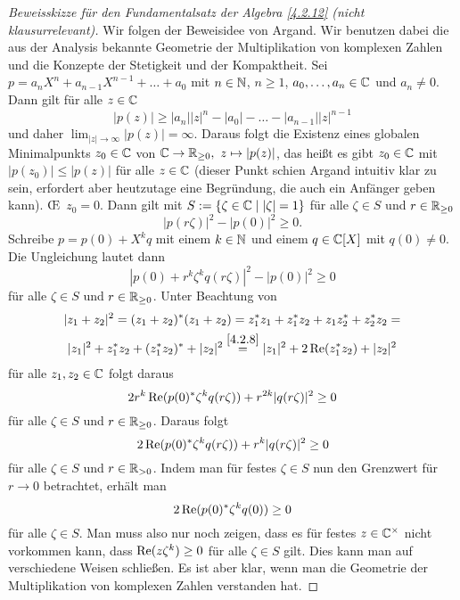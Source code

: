 \documentclass[../../main.tex]{subfiles}
\begin{document}
\begin{proof}[Beweisskizze für den Fundamentalsatz der Algebra \ref{4.2.12} (nicht klausurrelevant)] Wir folgen der Beweisidee
von Argand. Wir benutzen dabei die aus der Analysis bekannte
Geometrie der Multiplikation von komplexen Zahlen und die Konzepte der Stetigkeit und der Kompaktheit.
Sei $p=a_nX^n+a_{n-1}X^{n-1}+\dots+a_0$ mit $n\in\mathbb N$, $n\ge1$, $a_0,\dots,a_n\in\mathbb C$ und $a_n\ne0$. Dann gilt für alle $z\in\mathbb C$
$$|p(z)|\ge|a_n||z|^n-|a_0|-\dots-|a_{n-1}||z|^{n-1}$$
und daher $\lim_{|z|\to\infty}|p(z)|=\infty$. Daraus folgt die Existenz eines globalen Minimalpunkts $z_0\in\mathbb C$ von $\mathbb C\to\mathbb R_{\ge0},\ z\mapsto|p(z)|$, das heißt es gibt $z_0\in\mathbb C$
mit $|p(z_0)|\le|p(z)|$ für alle $z\in\mathbb C$ (dieser Punkt schien Argand intuitiv klar zu sein, erfordert aber heutzutage eine Begründung, die auch ein Anfänger geben kann). \OE\ $z_0=0$. Dann gilt mit
$S:=\{\zeta\in\mathbb C\mid|\zeta|=1\}$ für alle $\zeta\in S$ und $r\in\mathbb R_{\ge0}$
$$|p(r\zeta)|^2-|p(0)|^2\ge0.$$
Schreibe $p=p(0)+X^kq$ mit einem $k\in\mathbb N$ und einem $q\in\mathbb C[X]$ mit $q(0)\ne0$. Die Ungleichung lautet dann
$$|p(0)+r^k\zeta^kq(r\zeta)|^2-|p(0)|^2\ge0$$
 für alle $\zeta\in S$ und $r\in\mathbb R_{\ge0}$.
 Unter Beachtung von
 \begin{multline*}
 |z_1+z_2|^2=(z_1+z_2)^*(z_1+z_2)=z_1^*z_1+z_1^*z_2+z_1z_2^*+z_2^*z_2=\\
 |z_1|^2+z_1^*z_2+(z_1^*z_2)^*+|z_2|^2\overset{\ref{4.2.8}}= |z_1|^2+2\operatorname{Re}(z_1^*z_2)+|z_2|^2
 \end{multline*}
 für alle $z_1,z_2\in\mathbb C$ folgt daraus
 $$2r^k\operatorname{Re}(p(0)^*\zeta^kq(r\zeta))+r^{2k}|q(r\zeta)|^2\ge0$$
  für alle $\zeta\in S$ und $r\in\mathbb R_{\ge0}$.
 Daraus folgt
 $$2\operatorname{Re}(p(0)^*\zeta^kq(r\zeta))+r^{k}|q(r\zeta)|^2\ge0$$
   für alle $\zeta\in S$ und $r\in\mathbb R_{>0}$.
   Indem man für festes $\zeta\in S$ nun den Grenzwert für $r\to0$ betrachtet, erhält man
    $$2\operatorname{Re}(p(0)^*\zeta^kq(0))\ge0$$
    für alle $\zeta\in S$. Man muss also nur noch zeigen, dass es für festes $z\in\mathbb C^\times$ nicht vorkommen kann, dass
    $\operatorname{Re}(z\zeta^k)\ge0$ für alle $\zeta\in S$ gilt. Dies kann man auf verschiedene Weisen schließen. Es ist aber klar, wenn man die Geometrie der Multiplikation von komplexen Zahlen verstanden hat.
\end{proof}
\end{document}
